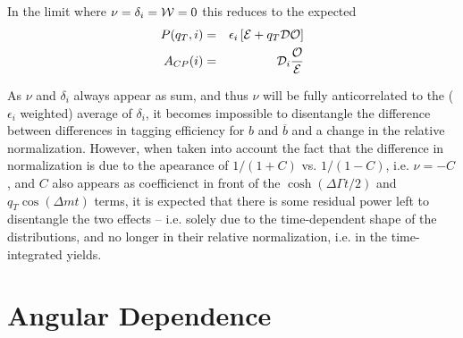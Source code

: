\documentclass[a4paper,9pt,twoside]{article}
\begin{document}
In the limit where $\nu=\delta_i={\cal W}=0$ this reduces to the expected
\begin{eqnarray}
   P(q_T,i) &=& \epsilon_i\left[  {\cal E} +q_T {\cal D} {\cal O}\right]  \\
   A_{CP}(i) &=&  {\cal D}_i\frac{\cal O }{\cal E}
\end{eqnarray}

As $\nu$ and $\delta_i$ always appear as sum, and thus $\nu$ will be fully anticorrelated to the ($\epsilon_i$ weighted) average of $\delta_i$,
it becomes impossible to disentangle the difference between differences in tagging efficiency for $b$ and $\overline{b}$
and a change in the relative normalization. However, when taken into account the fact that the difference in normalization
is due to the apearance of $1/(1+C)$ vs. $1/(1-C)$, i.e. $\nu = -C$, and $C$ also appears as coefficienct in front of the $\cosh\left(\Delta\Gamma t/2\right)$
and $q_T\cos(\Delta m t)$ terms, it is expected that there is some residual power left to disentangle the two effects -- i.e. 
solely due to the time-dependent shape of the distributions, and no longer in their relative normalization, i.e. in the time-integrated yields.


\vfill
\pagebreak

\section{Angular Dependence}
\end{document}
